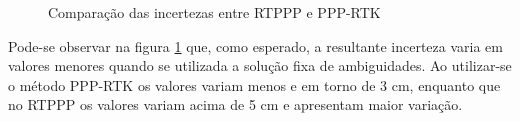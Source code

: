 \begin{figure}[H]
\centering
{}
\caption{Comparação das incertezas entre RTPPP e PPP-RTK}
\label{comparacao_incert}
\end{figure}

Pode-se observar na figura \ref{comparacao_incert} que, como esperado, a resultante incerteza varia em valores menores quando se utilizada a solução fixa de ambiguidades. Ao utilizar-se o método PPP-RTK os valores variam menos e em torno de 3 cm, enquanto que no RTPPP os valores variam acima de 5 cm e apresentam maior variação.

